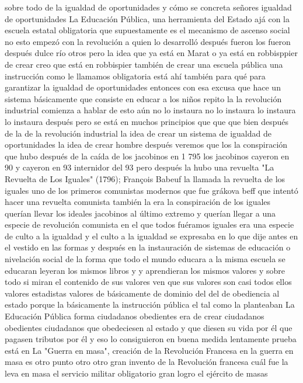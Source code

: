 sobre todo de la igualdad de oportunidades y cómo se concreta señores igualdad de oportunidades
La Educación Pública, una herramienta del Estado
ajá con la escuela estatal obligatoria que supuestamente es el mecanismo de ascenso social no
esto empezó con la revolución a quien lo desarrolló después fueron los fueron después dulce río otros
pero la idea que ya está en Marat o ya está en robbisppier de crear creo que está en robbispier también de crear una escuela pública
una instrucción como le llamamos obligatoria está ahí también para qué para garantizar la igualdad
de oportunidades entonces con esa excusa que hace un sistema básicamente que consiste en educar a los niños
repito la la revolución industrial comienza a hablar de esto aún no lo instaura no lo instaura lo instaura lo instaura después
pero se está en muchos principios que que que bien después de la de la revolución industrial la idea de crear un sistema de igualdad
de oportunidades la idea de crear hombre después veremos que los la conspiración
que hubo después de la caída de los jacobinos en 1 795 los jacobinos cayeron en 90 y
cayeron en 93 internidor del 93 pero después la hubo una revuelta
"La Revuelta de Los Iguales" (1796); François Babeuf
la llamada la revuelta de los iguales uno de los primeros comunistas modernos que fue grákova beff
que intentó hacer una revuelta comunista también la era la conspiración de los iguales querían llevar los ideales jacobinos al último extremo
y querían llegar a una especie de revolución comunista en el que todos fuéramos iguales era una especie de culto a la igualdad y el culto a la igualdad
se expresaba en lo que dije antes en el vestido en las formas y después en la instauración de sistemas de educación
o nivelación social de la forma que todo el mundo educara a la misma escuela se educaran leyeran los mismos libros
y y aprendieran los mismos valores y sobre todo si miran el contenido de sus valores ven que sus valores son casi todos ellos
valores estadistas valores de básicamente de dominio del
del de obediencia al estado porque la básicamente la instrucción pública el tal como la planteaban
La Educación Pública forma ciudadanos obedientes
era de crear ciudadanos obedientes ciudadanos que obedeciesen al estado y que diesen su vida por él
que pagasen tributos por él y eso lo consiguieron en buena medida lentamente prueba está en
La "Guerra en masa", creación de la Revolución Francesa
en la guerra en masa es otro punto otro otro gran invento de la Revolución francesa cuál fue la leva en masa
el servicio militar obligatorio gran logro el ejército de masas
